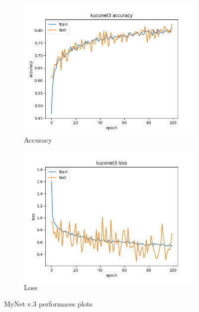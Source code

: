 \documentclass[11pt]{article}
\begin{document}
\begin{figure}[H]
	\centering
	\begin{subfigure}[b]{0.4\linewidth}
		\includegraphics[width=\linewidth]{../images/kuconet3_100_epochs_accuracy.png}
		\caption{Accuracy}
	\end{subfigure}
	\begin{subfigure}[b]{0.4\linewidth}
		\includegraphics[width=\linewidth]{../images/kuconet3_100_epochs_loss.png}
		\caption{Loss}
	\end{subfigure}
	\caption{MyNet v.3 performaces plots}
	\label{fig:mynet3performances}
\end{figure}
\end{document}
